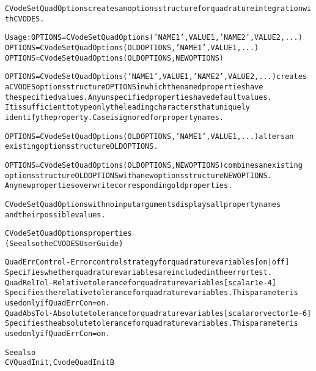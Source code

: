 \begin{alltt}
CVodeSetQuadOptions creates an options structure for quadrature integration with CVODES.

   Usage: OPTIONS = CVodeSetQuadOptions('NAME1',VALUE1,'NAME2',VALUE2,...)
          OPTIONS = CVodeSetQuadOptions(OLDOPTIONS,'NAME1',VALUE1,...)
          OPTIONS = CVodeSetQuadOptions(OLDOPTIONS,NEWOPTIONS)

   OPTIONS = CVodeSetQuadOptions('NAME1',VALUE1,'NAME2',VALUE2,...) creates 
   a CVODES options structure OPTIONS in which the named properties have 
   the specified values. Any unspecified properties have default values. 
   It is sufficient to type only the leading characters that uniquely 
   identify the property. Case is ignored for property names. 
   
   OPTIONS = CVodeSetQuadOptions(OLDOPTIONS,'NAME1',VALUE1,...) alters an 
   existing options structure OLDOPTIONS.
   
   OPTIONS = CVodeSetQuadOptions(OLDOPTIONS,NEWOPTIONS) combines an existing 
   options structure OLDOPTIONS with a new options structure NEWOPTIONS. 
   Any new properties overwrite corresponding old properties. 
   
   CVodeSetQuadOptions with no input arguments displays all property names 
   and their possible values.
   
CVodeSetQuadOptions properties
(See also the CVODES User Guide)

QuadErrControl - Error control strategy for quadrature variables [ on | {off} ]
   Specifies whether quadrature variables are included in the error test.
QuadRelTol - Relative tolerance for quadrature variables [ scalar {1e-4} ]
   Specifies the relative tolerance for quadrature variables. This parameter is
   used only if QuadErrCon=on.
QuadAbsTol - Absolute tolerance for quadrature variables [ scalar or vector {1e-6} ]
   Specifies the absolute tolerance for quadrature variables. This parameter is
   used only if QuadErrCon=on.

   See also
        CVQuadInit, CvodeQuadInitB
\end{alltt}






\vspace{0.1in}